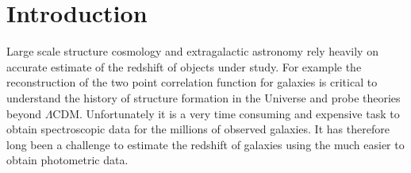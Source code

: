 \section{Introduction}
Large scale structure cosmology and extragalactic astronomy rely heavily on accurate estimate of the redshift of objects under study. For example the reconstruction of the two point correlation function for galaxies is critical to understand the history of structure formation in the Universe and probe theories beyond $\Lambda$CDM. Unfortunately it is a very time consuming and expensive task to obtain spectroscopic data for the millions of observed galaxies. It has therefore long been a challenge to estimate the redshift of galaxies using the much easier to obtain photometric data.